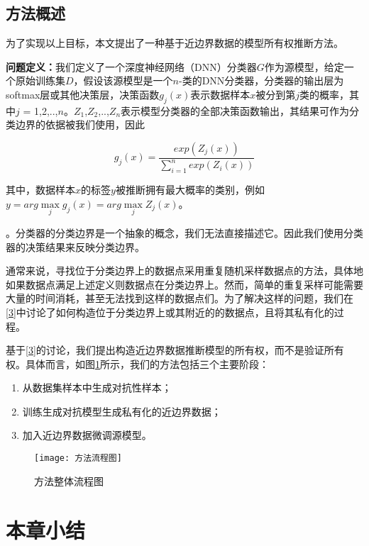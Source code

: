 \subsection{方法概述}

为了实现以上目标，本文提出了一种基于近边界数据的模型所有权推断方法。

\textbf{问题定义：}我们定义了一个深度神经网络（DNN）分类器$G$作为源模型，给定一个原始训练集$D$，假设该源模型是一个$n$-类的DNN分类器，分类器的输出层为softmax层或其他决策层，决策函数$g_j(x)$表示数据样本$x$被分到第$j$类的概率，其中$j$ = 1,2,..,$n$。$Z_1$,$Z_2$,..,$Z_n$表示模型分类器的全部决策函数输出，其结果可作为分类边界的依据被我们使用，因此

\begin{equation}
	g_j(x) = \frac{exp(Z_j(x))}{\sum_{i = 1}^n exp(Z_i(x))}
\end{equation}

\noindent 其中，数据样本$x$的标签$y$被推断拥有最大概率的类别，例如$y = arg \mathop{max} \limits_j g_j(x) = arg \mathop{max} \limits_j Z_j(x)$。

\begin{myDef}
	\label{def:2}
	。分类器的分类边界是一个抽象的概念，我们无法直接描述它。因此我们使用分类器的决策结果来反映分类边界。
\end{myDef}

通常来说，寻找位于分类边界上的数据点采用重复随机采样数据点的方法，具体地如果数据点满足上述定义则数据点在分类边界上。然而，简单的重复采样可能需要大量的时间消耗，甚至无法找到这样的数据点们。为了解决这样的问题，我们在\ref{3}中讨论了如何构造位于分类边界上或其附近的的数据点，且将其私有化的过程。

基于\ref{3}的讨论，我们提出构造近边界数据推断模型的所有权，而不是验证所有权。具体而言，如图\ref{方法流程图}所示，我们的方法包括三个主要阶段：
\begin{enumerate}
	\renewcommand{\labelenumi}{\theenumi)}
	\item 从数据集样本中生成对抗性样本；
	\item 训练生成对抗模型生成私有化的近边界数据；
	\item 加入近边界数据微调源模型。
\end{enumerate}

\begin{figure}[htbp]%
	\centering
	\texttt{[image: 方法流程图]}
	\setlength{\abovecaptionskip}{5mm} %
	\caption{方法整体流程图}
	\label{方法流程图}
\end {figure}
	







\section{本章小结}



